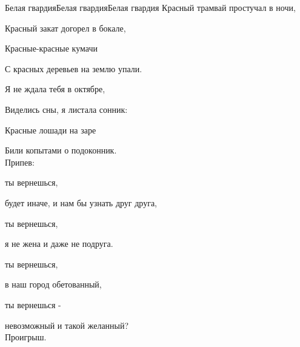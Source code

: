 \documentclass[11pt,a5paper]{book}
\renewcommand{\tt}{\indent \indent}
\begin{document}
\begin{song}{Белая гвардия}{}{Белая гвардия}{Белая гвардия}{}{}
Красный трамвай простучал в ночи,\par
Красный закат догорел в бокале,\par
Красные-красные кумачи\par
С красных деревьев на землю упали.\par
Я не ждала тебя в октябре,\par
Виделись сны, я листала сонник:\par
Красные лошади на заре\par
Били копытами о подоконник.\\

Припев:\par
{} ты вернешься,\par
{} будет иначе, и нам бы узнать друг друга,\par
{} ты вернешься,\par
{} я не жена и даже не подруга.\par
{} ты вернешься,\par
{} в наш город обетованный,\par
{} ты вернешься -\par
{} невозможный и такой желанный?\\

Проигрыш.\par

\end{song}
\end{document}
